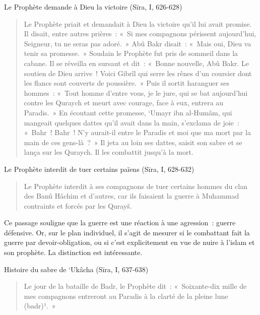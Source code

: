 Le Prophète demande à Dieu la victoire (Sīra, I, 626-628)
\begin{quote}
    

{Le Prophète priait et demandait à Dieu la victoire qu'il lui avait
promise. Il disait, entre autres prières~: «~Si mes compagnons périssent
aujourd'hui, Seigneur, tu ne seras pas adoré.~» Abû Bakr disait~: «~Mais
oui, Dieu va tenir sa promesse.~» Soudain le Prophète fut pris de
sommeil dans la cabane. Il se réveilla en sursaut et dit~: «~Bonne
nouvelle, Abû Bakr. Le soutien de Dieu arrive~! Voici Gibrîl qui serre
les rênes d'un coursier dont les flancs sont couverts de poussière.~»
Puis il sortit haranguer ses hommes~: «~Tout homme d'entre vous, je le
jure, qui se bat aujourd'hui contre les Quraych et meurt avec courage,
face à eux, entrera au Paradis.~» En écoutant cette promesse, `Umayr ibn
al-Humâm, qui mangeait quelques dattes qu'il avait dans la main,
s'exclama de joie~: «~Bahr~! Bahr~! N'y aurait-il entre le Paradis et
moi que ma mort par la main de ces gens-là~?~» Il jeta au loin ses
dattes, saisit son sabre et se lança sur les Quraych. Il les combattit
jusqu'à la mort.}
\end{quote}
Le Prophète interdit de tuer certains païens (Sīra, I, 628-632)
\begin{quote}
    
{Le Prophète interdit à ses compagnons de tuer certains hommes du
clan des Banû Hâchim et d'autres, car ils faisaient la guerre à Muhammad
contraints et forcés par les Qurayš.}
\end{quote}

Ce passage souligne que la guerre est une réaction à une agression~:
guerre défensive. Or, sur le plan individuel, il s'agit de mesurer si le
combattant fait la guerre par devoir-obligation, ou si c'est
explicitement en vue de nuire à l'islam et son prophète. La distinction
est intéressante.

Histoire du sabre de `Ukâcha (Sīra, I, 637-638)
\begin{quote}
{Le jour de la bataille de Badr, le Prophète dit~: «~Soixante-dix
mille de mes compagnons entreront au Paradis à la clarté de la pleine
lune (badr)¹.~»}
\end{quote}

